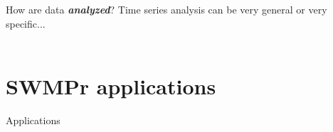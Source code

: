 \documentclass[serif]{beamer}\usepackage[]{graphicx}\usepackage[]{color}
\newcommand{\Bigtxt}[1]{\textbf{\textit{#1}}}
\begin{document}
\begin{frame}{How are data \Bigtxt{analyzed}?}
Time series analysis can be very general or very specific...\\~\\

\end{frame}

\section{SWMPr applications}

\begin{frame}{Applications}

\end{frame}
\end{document}
